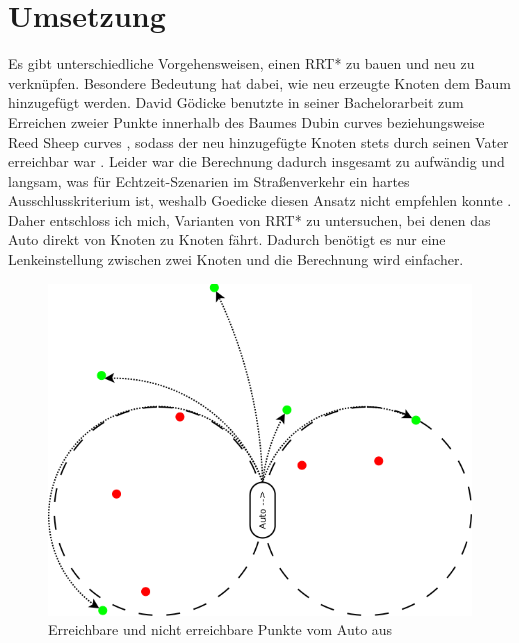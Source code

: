 \section{Umsetzung}
\label{sec:Umsetzung}
Es gibt unterschiedliche Vorgehensweisen, einen RRT* zu bauen und neu zu verknüpfen. Besondere Bedeutung hat dabei, wie neu erzeugte Knoten dem Baum hinzugefügt werden. David Gödicke benutzte in seiner Bachelorarbeit zum Erreichen zweier Punkte innerhalb des Baumes Dubin curves \citep{Dubin61} beziehungsweise Reed Sheep curves \citep{reeds1990optimal}, sodass der neu hinzugefügte Knoten stets durch seinen Vater erreichbar war \citep{Goedicke18}. Leider war die Berechnung dadurch insgesamt zu aufwändig und langsam, was für Echtzeit-Szenarien im Straßenverkehr ein hartes Ausschlusskriterium ist, weshalb Goedicke diesen Ansatz nicht empfehlen konnte \citep[vergleiche][Kapitel 7]{Goedicke18}. \\
Daher entschloss ich mich, Varianten von RRT* zu untersuchen, bei denen das Auto direkt von Knoten zu Knoten fährt. Dadurch benötigt es nur eine Lenkeinstellung zwischen zwei Knoten und die Berechnung wird einfacher.\\
\begin{figure}
	\label{fig:reachable}
	\centering
	\includegraphics[scale=0.6]{Bilder/Erreichbarkeit_Punkte.png}
	\caption{Erreichbare und nicht erreichbare Punkte vom Auto aus}
\end{figure}
